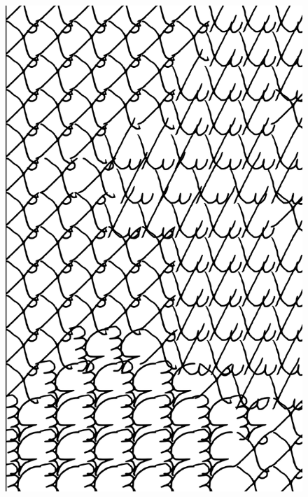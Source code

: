 \makeatletter\@openrightfalse
\movetooddpage
\begin{absolutelynopagebreak}
\begin{vplace}
\begin{figure}[H]
\begin{adjustwidth}{-0.99cm}{}
  \centering
  \vspace*{-1.97cm}
  \hspace*{-0.65cm}
  \includegraphics[width=115mm]{./imgs/img7.pdf}  
  \hfill
\end{adjustwidth}

\thispagestyle{empty}

\end{figure}
\end{vplace}

\end{absolutelynopagebreak}

